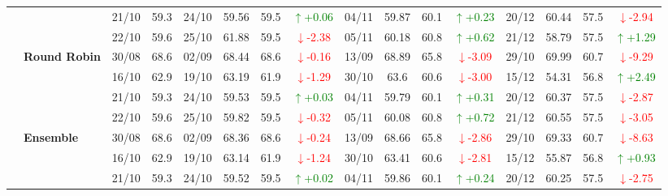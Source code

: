 {\begin{longtable}{llcc|cccc|cccc|cccc}
&
& 21/10 & 59.3 & 24/10 & 59.56 & 59.5 & \textcolor{green}{\(\uparrow\)+0.06} & 04/11 & 59.87 & 60.1 & \textcolor{green}{\(\uparrow\)+0.23} & 20/12 & 60.44 & 57.5 & \textcolor{red}{\(\downarrow\)-2.94} \\

&
& 22/10 & 59.6 & 25/10 & 61.88 & 59.5 & \textcolor{red}{\(\downarrow\)-2.38} & 05/11 & 60.18 & 60.8 & \textcolor{green}{\(\uparrow\)+0.62} & 21/12 & 58.79 & 57.5 & \textcolor{green}{\(\uparrow\)+1.29} \\
\cmidrule(lr){2-16}


& \textbf{Round Robin}
& 30/08 & 68.6 & 02/09 & 68.44 & 68.6 & \textcolor{red}{\(\downarrow\)-0.16} & 13/09 & 68.89 & 65.8 & \textcolor{red}{\(\downarrow\)-3.09} & 29/10 & 69.99 & 60.7 & \textcolor{red}{\(\downarrow\)-9.29} \\

&
& 16/10 & 62.9 & 19/10 & 63.19 & 61.9 & \textcolor{red}{\(\downarrow\)-1.29} & 30/10 & 63.6 & 60.6 & \textcolor{red}{\(\downarrow\)-3.00} & 15/12 & 54.31 & 56.8 & \textcolor{green}{\(\uparrow\)+2.49} \\

&
& 21/10 & 59.3 & 24/10 & 59.53 & 59.5 & \textcolor{green}{\(\uparrow\)+0.03} & 04/11 & 59.79 & 60.1 & \textcolor{green}{\(\uparrow\)+0.31} & 20/12 & 60.37 & 57.5 & \textcolor{red}{\(\downarrow\)-2.87} \\

&
& 22/10 & 59.6 & 25/10 & 59.82 & 59.5 & \textcolor{red}{\(\downarrow\)-0.32} & 05/11 & 60.08 & 60.8 & \textcolor{green}{\(\uparrow\)+0.72} & 21/12 & 60.55 & 57.5 & \textcolor{red}{\(\downarrow\)-3.05} \\
\cmidrule(lr){2-16}

& \textbf{Ensemble}
& 30/08 & 68.6 & 02/09 & 68.36 & 68.6 & \textcolor{red}{\(\downarrow\)-0.24} & 13/09 & 68.66 & 65.8 & \textcolor{red}{\(\downarrow\)-2.86} & 29/10 & 69.33 & 60.7 & \textcolor{red}{\(\downarrow\)-8.63} \\

&
& 16/10 & 62.9 & 19/10 & 63.14 & 61.9 & \textcolor{red}{\(\downarrow\)-1.24} & 30/10 & 63.41 & 60.6 & \textcolor{red}{\(\downarrow\)-2.81} & 15/12 & 55.87 & 56.8 & \textcolor{green}{\(\uparrow\)+0.93} \\

&
& 21/10 & 59.3 & 24/10 & 59.52 & 59.5 & \textcolor{green}{\(\uparrow\)+0.02} & 04/11 & 59.86 & 60.1 & \textcolor{green}{\(\uparrow\)+0.24} & 20/12 & 60.25 & 57.5 & \textcolor{red}{\(\downarrow\)-2.75} \\


\end{longtable}}
